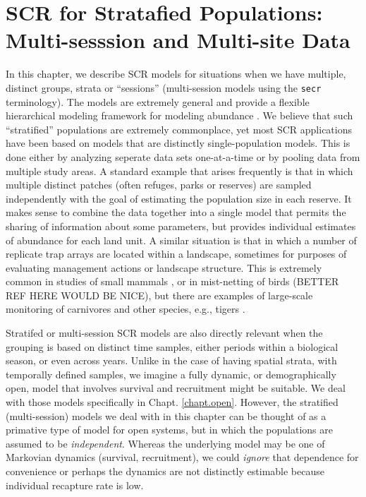 \chapter{SCR for Stratafied Populations: 
Multi-sesssion and Multi-site Data}
\label{chapt.hscr}

\vspace{0.3cm}


In this chapter, we describe SCR models for situations when
we have multiple, distinct groups, strata or ``sessions''
(multi-session models using the \mbox{\tt secr} terminology). The
models are extremely general and provide a flexible hierarchical
modeling framework for modeling abundance \citep{converse_royle:2012,
  royle_etal:2012arXiv}.  We believe that such ``stratified''
populations are extremely commonplace, yet most SCR applications have
been based on models that are distinctly single-population
models. This is done either by analyzing seperate data sets
one-at-a-time or by pooling data from multiple study areas.  A
standard example that arises frequently is that in which multiple
distinct patches (often refuges, parks or reserves) are sampled
independently with the goal of estimating the population size in each
reserve. It makes sense to combine the data together into a single
model that permits the sharing of information about some parameters,
but provides individual estimates of abundance for each land unit.  A
similar situation is that in which a number of replicate trap arrays
are located within a landscape, sometimes for purposes of evaluating
management actions or landscape structure. This is extremely common in studies of small
mammals \citep{converse_etal:2006jwm, converse_etal:2006ea,
  converse_royle:2012}, or in mist-netting of birds
\citep{desante_etal:1995} (BETTER REF HERE WOULD BE
NICE), but there are examples of large-scale monitoring of carnivores
and other species, e.g., tigers \citep{jhala_etal:2011}.


Stratifed or multi-session SCR models are also directly relevant when
the grouping is based on distinct time samples, either periods within
a biological season, or even across years. 
Unlike in the case of having spatial strata, with temporally defined
samples, we imagine a fully dynamic, or demographically open, model
that involves survival and recruitment might be suitable. We deal with
those models specifically in Chapt. \ref{chapt.open}.  However, the
stratified (multi-session) models we deal with in this chapter can be
thought of as a primative type of model for open systems, but in which
the populations are assumed to be {\it independent}. Whereas the
underlying model may be one of Markovian dynamics (survival,
recruitment), we could {\it ignore} that dependence for convenience or
perhaps the dynamics are not distinctly estimable because individual
recapture rate is low.


